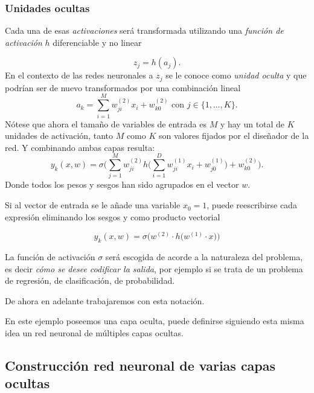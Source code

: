 \subsubsection*{Unidades ocultas}
Cada una de esas \textit{activaciones} será transformada
utilizando una \textit{función de activación} $h$ 
diferenciable y no linear

\begin{equation}
    z_j = h(a_j).
\end{equation}
En el contexto de las redes neuronales a $z_j$ se le conoce como \textit{unidad oculta} y que podrían ser de 
nuevo  transformados por una combinación lineal 
\begin{equation}
    a_k = \sum_{i=1}^M w_{ji}^{(2)} x_i + w_{k0}^{(2)}
    \text{ con } j \in \{1, \ldots, K \}.
\end{equation}
Nótese que ahora el tamaño de variables de entrada es $M$
y hay un total de $K$ unidades de activación, tanto $M$ como $K$ son
valores fijados por el diseñador de la red. 
Y combinando ambas capas resulta: 
\begin{equation}
    y_k(x,w) = \sigma 
    \biggl( 
        \sum^M_{j=1} w_{ji}^{(2)}
        h 
        \biggl(
            \sum_{i=1}^D w_{ji}^{(1)} x_i + w_{j0}^{(1)}
        \biggr)
        + w_{k0}^{(2)}
    \biggr) .
\end{equation}
Donde todos los pesos y sesgos han sido agrupados en el vector $w$. 

Si al vector de entrada se le añade una variable $x_0 = 1$, puede reescribirse cada expresión eliminando los sesgos y como producto vectorial

\begin{equation}
    y_k(x,w) = \sigma 
    \bigl(
         w^{(2)} \cdot
        h 
        \bigl(
             w^{(1)} \cdot x 
        \bigr)
    \bigr)
\end{equation}  

La función de activación $\sigma$ será escogida de acorde a la
naturaleza del problema, es decir \textit{cómo se desee codificar la salida}, por ejemplo si se trata de un problema de regresión, de clasificación, de probabilidad. 
 
De ahora en adelante trabajaremos con esta notación. 


En este ejemplo poseemos una capa oculta, 
puede definirse siguiendo esta misma idea
un red neuronal de múltiples capas ocultas. 

\subsection{Construcción red neuronal de varias capas ocultas} \label{rrnn:construcción_generalizada}

